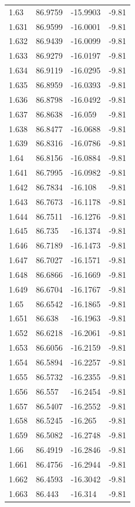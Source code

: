 \begin{tabular}{llll}
1.63 & 86.9759 & -15.9903 & -9.81 \\
1.631 & 86.9599 & -16.0001 & -9.81 \\
1.632 & 86.9439 & -16.0099 & -9.81 \\
1.633 & 86.9279 & -16.0197 & -9.81 \\
1.634 & 86.9119 & -16.0295 & -9.81 \\
1.635 & 86.8959 & -16.0393 & -9.81 \\
1.636 & 86.8798 & -16.0492 & -9.81 \\
1.637 & 86.8638 & -16.059 & -9.81 \\
1.638 & 86.8477 & -16.0688 & -9.81 \\
1.639 & 86.8316 & -16.0786 & -9.81 \\
1.64 & 86.8156 & -16.0884 & -9.81 \\
1.641 & 86.7995 & -16.0982 & -9.81 \\
1.642 & 86.7834 & -16.108 & -9.81 \\
1.643 & 86.7673 & -16.1178 & -9.81 \\
1.644 & 86.7511 & -16.1276 & -9.81 \\
1.645 & 86.735 & -16.1374 & -9.81 \\
1.646 & 86.7189 & -16.1473 & -9.81 \\
1.647 & 86.7027 & -16.1571 & -9.81 \\
1.648 & 86.6866 & -16.1669 & -9.81 \\
1.649 & 86.6704 & -16.1767 & -9.81 \\
1.65 & 86.6542 & -16.1865 & -9.81 \\
1.651 & 86.638 & -16.1963 & -9.81 \\
1.652 & 86.6218 & -16.2061 & -9.81 \\
1.653 & 86.6056 & -16.2159 & -9.81 \\
1.654 & 86.5894 & -16.2257 & -9.81 \\
1.655 & 86.5732 & -16.2355 & -9.81 \\
1.656 & 86.557 & -16.2454 & -9.81 \\
1.657 & 86.5407 & -16.2552 & -9.81 \\
1.658 & 86.5245 & -16.265 & -9.81 \\
1.659 & 86.5082 & -16.2748 & -9.81 \\
1.66 & 86.4919 & -16.2846 & -9.81 \\
1.661 & 86.4756 & -16.2944 & -9.81 \\
1.662 & 86.4593 & -16.3042 & -9.81 \\
1.663 & 86.443 & -16.314 & -9.81 \\

\end{tabular}
